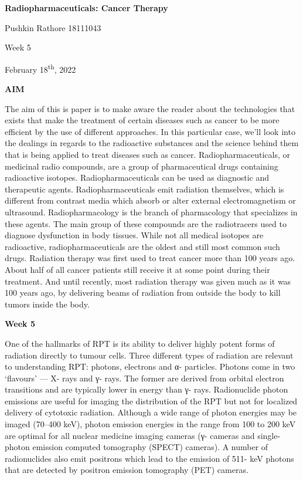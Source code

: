 \documentclass[
]{article}
\author{}
\date{}
\begin{document}
\textbf{{Radiopharmaceuticals: Cancer Therapy}}

Pushkin Rathore 18111043

Week 5

February 18\textsuperscript{th}, 2022

\textbf{AIM}

The aim of this is paper is to make aware the reader about the
technologies that exists that make the treatment of certain diseases
such as cancer to be more efficient by the use of different approaches.
In this particular case, we'll look into the dealings in regards to the
radioactive substances and the science behind them that is being applied
to treat diseases such as cancer. Radiopharmaceuticals, or medicinal
radio compounds, are a group of pharmaceutical drugs containing
radioactive isotopes. Radiopharmaceuticals can be used as diagnostic and
therapeutic agents. Radiopharmaceuticals emit radiation themselves,
which is different from contrast media which absorb or alter external
electromagnetism or ultrasound. Radiopharmacology is the branch of
pharmacology that specializes in these agents. The main group of these
compounds are the radiotracers used to diagnose dysfunction in body
tissues. While not all medical isotopes are radioactive,
radiopharmaceuticals are the oldest and still most common such drugs.
Radiation therapy was first used to treat cancer more than 100 years
ago. About half of all cancer patients still receive it at some point
during their treatment. And until recently, most radiation therapy was
given much as it was 100 years ago, by delivering beams of radiation
from outside the body to kill tumors inside the body.

\textbf{Week 5}

One of the hallmarks of RPT is its ability to deliver highly potent
forms of radiation directly to tumour cells. Three different types of
radiation are relevant to understanding RPT: photons, electrons and α-
particles. Photons come in two `flavours' --- X- rays and γ- rays. The
former are derived from orbital electron transitions and are typically
lower in energy than γ- rays. Radionuclide photon emissions are useful
for imaging the distribution of the RPT but not for localized delivery
of cytotoxic radiation. Although a wide range of photon energies may be
imaged (70--400 keV), photon emission energies in the range from 100 to
200 keV are optimal for all nuclear medicine imaging cameras (γ- cameras
and single- photon emission computed tomography (SPECT) cameras). A
number of radionuclides also emit positrons which lead to the emission
of 511- keV photons that are detected by positron emission tomography
(PET) cameras.
\end{document}
